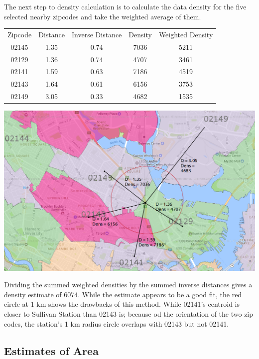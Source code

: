 \documentclass{article}
\begin{document}
The next step to density calculation is to calculate the data density for the five selected nearby zipcodes and take the weighted average of them. 

\begin{center}
\begin{tabular}{ c c c c c }
Zipcode & Distance & Inverse Distance & Density & Weighted Density \\
02145 & 1.35 & 0.74 & 7036 & 5211 \\
02129 & 1.36 & 0.74 & 4707 & 3461 \\
02141 & 1.59 & 0.63 & 7186 & 4519 \\
02143 & 1.64 & 0.61 & 6156 & 3753 \\
02149 & 3.05 & 0.33 & 4682 & 1535 \\
\end{tabular}
\end{center}

\begin{center}\includegraphics[scale=0.6]{Sullivan_for_density_with_markup}\end{center}

Dividing the summed weighted densities by the summed inverse distances gives a density estimate of 6074. While the estimate appears to be a good fit, the red circle at 1 km shows the drawbacks of this method. While 02141's centroid is closer to Sullivan Station than 02143 is; because od the orientation of the two zip codes, the station's 1 km radius circle overlaps with 02143 but not 02141. 

\subsection{Estimates of Area}
\end{document}
